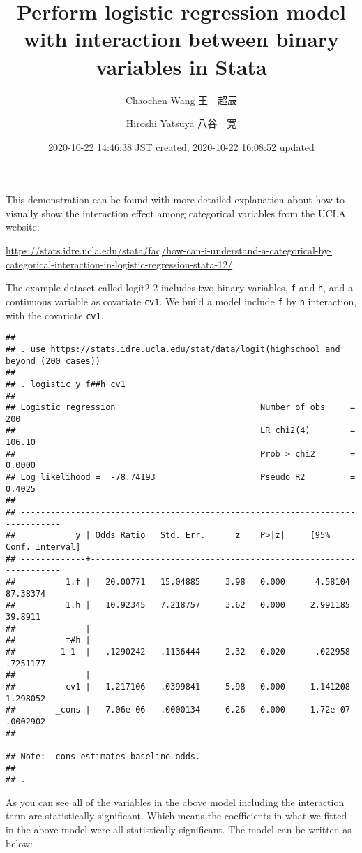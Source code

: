 \documentclass[
]{article}
\title{Perform logistic regression model with interaction between binary
variables in Stata}
\author{Chaochen Wang \textbar{} 王　超辰 \and Hiroshi Yatsuya
\textbar{} 八谷　寛}
\date{2020-10-22 14:46:38 JST created, 2020-10-22 16:08:52 updated}
\begin{document}
\maketitle

This demonstration can be found with more detailed explanation about how
to visually show the interaction effect among categorical variables from
the UCLA website:

\url{https://stats.idre.ucla.edu/stata/faq/how-can-i-understand-a-categorical-by-categorical-interaction-in-logistic-regression-stata-12/}

The example dataset called logit2-2 includes two binary variables,
\texttt{f} and \texttt{h}, and a continuous variable as covariate
\texttt{cv1}. We build a model include \texttt{f} by \texttt{h}
interaction, with the covariate \texttt{cv1}.

\begin{verbatim}
## 
## . use https://stats.idre.ucla.edu/stat/data/logit(highschool and beyond (200 cases))
## 
## . logistic y f##h cv1
## 
## Logistic regression                             Number of obs     =        200
##                                                 LR chi2(4)        =     106.10
##                                                 Prob > chi2       =     0.0000
## Log likelihood =  -78.74193                     Pseudo R2         =     0.4025
## 
## ------------------------------------------------------------------------------
##            y | Odds Ratio   Std. Err.      z    P>|z|     [95% Conf. Interval]
## -------------+----------------------------------------------------------------
##          1.f |   20.00771   15.04885     3.98   0.000      4.58104    87.38374
##          1.h |   10.92345   7.218757     3.62   0.000     2.991185     39.8911
##              |
##          f#h |
##         1 1  |   .1290242   .1136444    -2.32   0.020      .022958    .7251177
##              |
##          cv1 |   1.217106   .0399841     5.98   0.000     1.141208    1.298052
##        _cons |   7.06e-06   .0000134    -6.26   0.000     1.72e-07    .0002902
## ------------------------------------------------------------------------------
## Note: _cons estimates baseline odds.
## 
## .
\end{verbatim}

As you can see all of the variables in the above model including the
interaction term are statistically significant. Which means the
coefficients in what we fitted in the above model were all statistically
significant. The model can be written as below:
\end{document}
